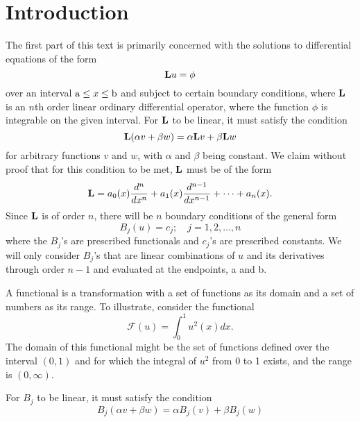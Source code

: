 \section{Introduction}
The first part of this text is primarily concerned with the solutions to differential equations of the form
\begin{equation}
    \mathrm{\bf{L}} u=\phi
\end{equation}
over an interval \(\mathrm{a} \leq x \leq \mathrm{b}\) and subject to certain boundary conditions, where \(\mathrm{\bf{L}}\) is an \(n\)th order linear ordinary differential operator, where the function \(\phi\) is integrable on the given interval. For \(\mathrm{\bf{L}}\) to be linear, it must satisfy the condition
\begin{equation}
	\mathrm{\bf{L}}(\alpha v + \beta w) = \alpha \mathrm{\bf{L}} v + \beta \mathrm{\bf{L}} w
\end{equation}
for arbitrary functions \(v\) and \(w\), with \(\alpha\) and \(\beta\) being constant. We claim without proof that for this condition to be met, \(\mathrm{\bf{L}}\) must be of the form
\begin{equation} 
	\mathrm{\bf{L}} = a_0(x) \frac{d^n}{dx^n} + a_1(x) \frac{d^{n-1}}{dx^{n-1}} + \cdots + a_n(x).
\end{equation}
	Since \(\mathrm{\bf{L}}\) is of order \(n\), there will be \(n\) boundary conditions of the general form 
\begin{equation}
	B_j (u) = c_j;\quad j=1,2,\dots,n
\end{equation}
where the \(B_j\)'s are prescribed functionals and \(c_j\)'s are prescribed constants. We will only consider \(B_j\)'s that are linear combinations of \(u\) and its derivatives through order \(n-1\) and evaluated at the endpoints, a and b. 

A functional is a transformation with a set of functions as its domain and a set of numbers as its range. To illustrate, consider the functional 
\begin{equation}
	\mathcal{F}(u) = \int_{0}^{1} u^2(x)dx.
\end{equation}
The domain of this functional might be the set of functions defined over the interval \((0,1)\) and for which the integral of \(u^2\) from 0 to 1 exists, and the range is \((0, \infty)\).

For \(B_j\) to be linear, it must satisfy the condition
\begin{equation}
	B_j(\alpha v + \beta w) = \alpha B_j (v) + \beta B_j(w)
\end{equation}